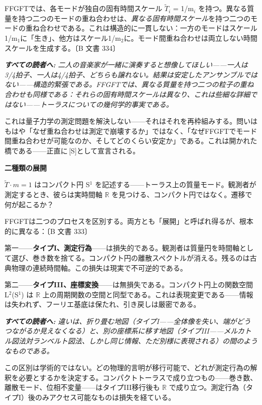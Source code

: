 \documentclass[11pt,openany]{book}
\newcommand{\status}[1]{\penalty10000\,{\tiny\textcolor{gray!70}{[#1]}}}
\newenvironment{laierspur}{%
  \par\vspace{4pt}%
  \noindent\small\itshape\color{blue!60!black}%
  \textbf{すべての読者へ:}\enspace\ignorespaces}{%
  \par\vspace{4pt}\normalsize\normalfont\normalcolor}
\begin{document}
FFGFTでは、各モードが独自の固有時間スケール $\tilde{T}_i$ = 1/m$_i$ を持つ。異なる質量を持つ二つのモードの重ね合わせは、\textit{異なる固有時間スケール}を持つ二つのモードの重ね合わせである。これは構造的に一貫しない：一方のモードはスケール1/m$_1$に「生き」、他方はスケール1/m$_2$に。モード間重ね合わせは両立しない時間スケールを生成する。〔B 文書 334〕

\begin{laierspur}
二人の音楽家が一緒に演奏すると想像してほしい——一人は3/4拍子、一人は4/4拍子、どちらも譲れない。結果は安定したアンサンブルではない——構造的緊張である。FFGFTでは、異なる質量を持つ二つの粒子の重ね合わせも同様である：それらの固有時間スケールは異なり、これは些細な詳細ではない——トーラスについての幾何学的事実である。
\end{laierspur}

これは量子力学の測定問題を解決しない——それはそれを再枠組みする。問いはもはや「なぜ重ね合わせは測定で崩壊するか」ではなく、「なぜFFGFTでモード間重ね合わせが可能なのか、そしてどのくらい安定か」である。これは開かれた橋である——正直に\status{S}として宣言される。

\textbf{二種類の展開}

$\tilde{T}\cdot m = 1$ はコンパクト円 S$^1$ を記述する——トーラス上の質量モード。観測者が測定するとき、彼らは実時間軸 $\mathbb{R}$ を見つける、コンパクト円ではなく。遷移で何が起こるか？

FFGFTは二つのプロセスを区別する。両方とも「展開」と呼ばれ得るが、根本的に異なる：〔B 文書 333〕

第一——\textbf{タイプI、測定行為}——は損失的である。観測者は質量円を時間軸として選び、巻き数を捨てる。コンパクト円の離散スペクトルが消える。残るのは古典物理の連続時間軸。この損失は現実で不可逆的である。

第二——\textbf{タイプIII、座標変換}——は無損失である。コンパクト円上の関数空間 L$^2$(S$^1$) は $\mathbb{R}$ 上の周期関数の空間と同型である。これは表現変更である——情報は失われず、フーリエ基底は保たれ、引き戻しは厳密である。

\begin{laierspur}
違いは、折り畳む地図（タイプI——全体像を失い、端がどうつながるか見えなくなる）と、別の座標系に移す地図（タイプIII——メルカトル図法対ランベルト図法、しかし同じ情報、ただ別様に表現される）の間のようなものである。
\end{laierspur}

この区別は学術的ではない。どの物理的言明が移行可能で、どれが測定行為の解釈を必要とするかを決定する。コンパクトトーラスで成り立つもの——巻き数、離散モード、位相不変量——はタイプIII移行後も $\mathbb{R}$ で成り立つ。測定行為（タイプI）後のみアクセス可能なものは損失を経ている。
\end{document}
